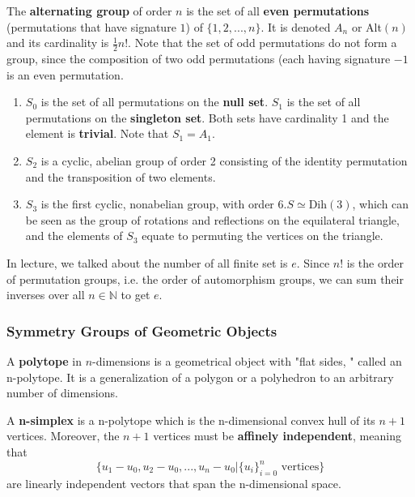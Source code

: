   \begin{definition}
    The \textbf{alternating group} of order $n$ is the set of all \textbf{even permutations} (permutations that have signature $1$) of $\{1, 2, ..., n\}$. It is denoted $A_{n}$ or Alt$(n)$ and its cardinality is $\frac{1}{2} n!$. Note that the set of odd permutations do not form a group, since the composition of two odd permutations (each having signature $-1$ is an even permutation. 
  \end{definition}

  \begin{example}
    \begin{enumerate}
      \item $S_{0}$ is the set of all permutations on the \textbf{null set}. $S_{1}$ is the set of all permutations on the \textbf{singleton set}. Both sets have cardinality 1 and the element is \textbf{trivial}. Note that $S_{1} = A_{1}$. 
      \item $S_{2}$ is a cyclic, abelian group of order 2 consisting of the identity permutation and the transposition of two elements. 
      \item $S_{3}$ is the first cyclic, nonabelian group, with order 6.$S \simeq \text{Dih}(3)$, which can be seen as the group of rotations and reflections on the equilateral triangle, and the elements of $S_{3}$ equate to permuting the vertices on the triangle. 
    \end{enumerate}
  \end{example}

  In lecture, we talked about the number of all finite set is $e$. Since $n!$ is the order of permutation groups, i.e. the order of automorphism groups, we can sum their inverses over all $n \in \mathbb{N}$ to get $e$. 

\subsubsection{Symmetry Groups of Geometric Objects} 

  \begin{definition}[Polytope]
    A \textbf{polytope} in $n$-dimensions is a geometrical object with "flat sides, " called an n-polytope. It is a generalization of a polygon or a polyhedron to an arbitrary number of dimensions. 
  \end{definition}

  \begin{definition}[Simplex]
    A \textbf{n-simplex} is a n-polytope which is the n-dimensional convex hull of its $n+1$ vertices. Moreover, the $n+1$ vertices must be \textbf{affinely independent}, meaning that
    \begin{equation}
      \{u_1 - u_0, u_2 - u_0, ..., u_n - u_0 | \{u_i\}_{i=0}^{n} \text{ vertices} \}
    \end{equation}
    are linearly independent vectors that span the n-dimensional space. 
  \end{definition}

